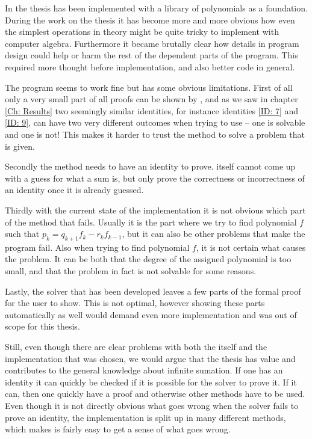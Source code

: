 In the thesis \WZ has been implemented with a library of polynomials as a foundation. During the work on the thesis it has become more and more obvious how even the simplest operations in theory might be quite tricky to implement with computer algebra. Furthermore it became brutally clear how details in program design could help or harm the rest of the dependent parts of the program. This required more thought before implementation, and also better code in general.

The program seems to work fine but has some obvious limitations. First of all only a very small part of all proofs can be shown by \WZ, and as we saw in chapter \ref{Ch: Results} two seemingly similar identities, for instance identities \ref{ID: 7} and \ref{ID: 9}, can have two very different outcomes when trying to use \WZ -- one is solvable and one is not! This makes it harder to trust the method to solve a problem that is given.

Secondly the method needs to have an identity to prove. \WZ itself cannot come up with a guess for what a sum is, but only prove the correctness or incorrectness of an identity once it is already guessed.

Thirdly with the current state of the implementation it is not obvious which part of the method that fails. Usually it is the part where we try to find polynomial $f$ such that $p_k=q_{k+1}f_k-r_kf_{k-1}$, but it can also be other problems that make the program fail. Also when trying to find polynomial $f$, it is not certain what causes the problem. It can be both that the degree of the assigned polynomial is too small, and that the problem in fact is not solvable for some reasons.

Lastly, the \WZ solver that has been developed leaves a few parts of the formal proof for the user to show. This is not optimal, however showing these parts automatically as well would demand even more implementation and was out of scope for this thesis.

Still, even though there are clear problems with both the \WZ itself and the implementation that was chosen, we would argue that the thesis has value and contributes to the general knowledge about infinite sumation. If one has an identity it can quickly be checked if it is possible for the \WZ solver to prove it. If it can, then one quickly have a proof and otherwise other methods have to be used. Even though it is not directly obvious what goes wrong when the solver fails to prove an identity, the implementation is split up in many different methods, which makes is fairly easy to get a sense of what goes wrong.


